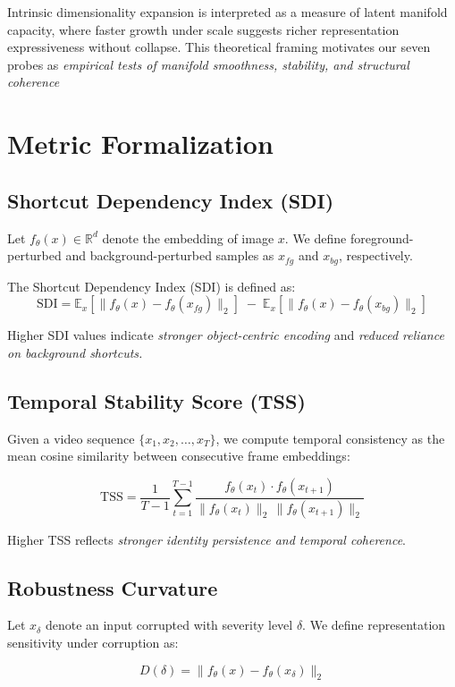 \documentclass[10pt,twocolumn]{article}
\begin{document}
Intrinsic dimensionality expansion is interpreted as a measure of latent manifold capacity, where faster growth under scale suggests richer representation expressiveness without collapse.
This theoretical framing motivates our seven probes as \textit{empirical tests of manifold smoothness, stability, and structural coherence}
\section{Metric Formalization}

\subsection{Shortcut Dependency Index (SDI)}  
Let \( f_\theta(x) \in \mathbb{R}^d \) denote the embedding of image \( x \).  
We define foreground-perturbed and background-perturbed samples as \( x_{fg} \) and \( x_{bg} \), respectively.

The Shortcut Dependency Index (SDI) is defined as:
\[
\text{SDI} = 
\mathbb{E}_{x} \left[ \| f_\theta(x) - f_\theta(x_{fg}) \|_2 \right]
\;-\;
\mathbb{E}_{x} \left[ \| f_\theta(x) - f_\theta(x_{bg}) \|_2 \right]
\]

Higher SDI values indicate \textit{stronger object-centric encoding} and \textit{reduced reliance on background shortcuts.}


\subsection{Temporal Stability Score (TSS)}  
Given a video sequence \( \{x_1, x_2, \dots, x_T\} \), we compute temporal consistency as the mean cosine similarity between consecutive frame embeddings:

\[
\text{TSS} = \frac{1}{T-1} \sum_{t=1}^{T-1}
\frac{
f_\theta(x_t) \cdot f_\theta(x_{t+1})
}{
\| f_\theta(x_t) \|_2 \, \| f_\theta(x_{t+1}) \|_2
}
\]

Higher TSS reflects \textit{stronger identity persistence and temporal coherence}.


\subsection{Robustness Curvature}  
Let \( x_\delta \) denote an input corrupted with severity level \( \delta \).  
We define representation sensitivity under corruption as:

\[
D(\delta) = \| f_\theta(x) - f_\theta(x_\delta) \|_2
\]
\end{document}
